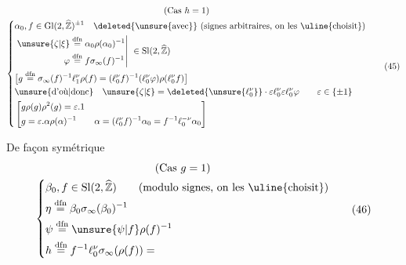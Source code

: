 \[
\begin{gathered}
\text{(Cas }h=1\text{)}\\
\left\{
\begin{aligned}
 &\alpha_0,f\in\mathrm{Gl}(2,\widehat{\mathbb Z})^{\pm1}
 \quad \deleted{\unsure{\text{avec}}}\ \text{(signes arbitraires, on les \uline{choisit})}\\
 &\left.
 \begin{aligned}
 \unsure{\zeta|\xi}&\overset{\mathrm{dfn}}=\alpha_0\rho(\alpha_0)^{-1}\\
 \varphi&\overset{\mathrm{dfn}}=f\sigma_\infty(f)^{-1}
 \end{aligned}
 \right|\ \in\mathrm{Sl}(2,\widehat{\mathbb Z})\\
 &\bigl[g\overset{\mathrm{dfn}}=\sigma_\infty(f)^{-1}\ell_1^\nu\rho(f)
 =(\ell_0^\nu f)^{-1}(\ell_0^\nu\varphi)\rho(\ell_0^\nu f)\bigr]\\
 &\text{\unsure{d'où|donc}}\quad
 \unsure{\zeta|\xi}=\deleted{\unsure{\ell_0^{\nu}}}\cdot\varepsilon\ell_0^{\nu}\varepsilon\ell_0^\nu\varphi
 \qquad\varepsilon\in\{\pm1\}\\
 &\left[\begin{aligned}
 &g\rho(g)\rho^2(g)=\varepsilon.1\\
 &g=\varepsilon.\alpha\rho(\alpha)^{-1}
 \qquad\alpha=(\ell_0^\nu f)^{-1}\alpha_0=f^{-1}\ell_0^{-\nu}\alpha_0
 \end{aligned}\right]
\end{aligned}
\right.
\end{gathered}
\tag{45}
\]


De façon symétrique
\[
\begin{gathered}
\text{(Cas }g=1\text{)}\\
\left\{
\begin{aligned}
 &\beta_0,f\in\mathrm{Sl}(2,\widehat{\mathbb Z})
 \qquad\text{(modulo signes, on les \uline{choisit})}\\
 &\eta\overset{\mathrm{dfn}}=\beta_0\sigma_\infty(\beta_0)^{-1}\\
 &\psi\overset{\mathrm{dfn}}=\unsure{\psi|f}\rho(f)^{-1}\\
 &h\overset{\mathrm{dfn}}=f^{-1}\ell_0^\nu\sigma_\infty(\rho(f))=
\end{aligned}
\right.
\end{gathered}
\tag{46}
\]

